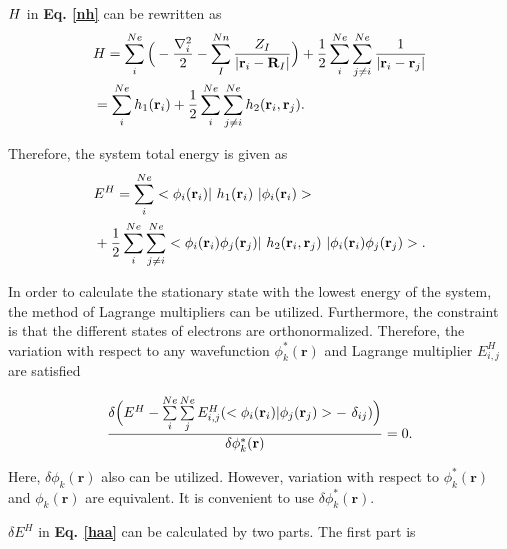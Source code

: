 \documentclass[a4paper, 12pt, titlepage,oneside,drop]{kthesis}
\begin{document}
${{H}}$ in \textbf{Eq. \ref{nh}} can be rewritten as
\begin{equation}\begin{split}
&  {{H}} = \sum\limits_i^{{Ne}} \Big( -\frac{{{\nabla}_{{i}}^{2}}}{2} - \sum\limits_I^{{Nn}} \frac{Z_{I}}{|\textbf{r}_{i}-\textbf{R}_{I}|} \Big) +   \frac{1}{2} \sum\limits_i^{{Ne}} \sum\limits_{j \neq i}^{{Ne}} \frac{1}{ |\textbf{r}_{i}-\textbf{r}_{j}|} \\
& = \sum\limits_i^{{Ne}} h_1(\textbf{r}_{i}) + \frac{1}{2} \sum\limits_i^{{Ne}} \sum\limits_{j \neq i}^{{Ne}} h_2(\textbf{r}_{i},\textbf{r}_{j}).
\end{split}
\end{equation}

Therefore, the system total energy is given as
\begin{equation}\begin{split}\label{bzd}
& E^{H} = \sum\limits_i^{{Ne}} <\bwff<i><i> | \  h_1(\textbf{r}_{i}) \ | \bwff<i><i> > \\
& +\frac{1}{2} \sum\limits_i^{{Ne}} \sum\limits_{j \neq i}^{{Ne}} <\bwff<i><i> \bwff<j><j>|\ h_2(\textbf{r}_{i},\textbf{r}_{j}) \ | \bwff<i><i> \bwff<j><j>>.  
\end{split}\end{equation}

In order to calculate the stationary state with the lowest energy of the system, the method of Lagrange multipliers can be utilized. Furthermore, the constraint is that the different states of electrons are orthonormalized.
Therefore, the variation with respect to any wavefunction $\phi^*_{k}(\textbf{r})$ and Lagrange multiplier $E_{i,j}^{H}$ are satisfied \cite{clasdft,bertsekas2003convex}

\begin{equation}\begin{split}\label{haa}
 \frac{ \delta  \Big(E^{{H}} - \sum\limits_{i}^{Ne} \sum\limits_{j}^{Ne} E_{i,j}^{H} (<\bwff<i><i> | \bwff<j><j>> -\ \delta_{ij})\Big)}{\delta \phi^*_{k}(\textbf{r})}  = 0. 
\end{split}
\end{equation}


Here, $ \delta \phi_{k}(\textbf{r})$ also can be utilized. However, variation with respect to $\phi^*_{k}(\textbf{r})$ and $\phi_{k}(\textbf{r})$ are equivalent. It is convenient to use $\delta \phi^*_{k}(\textbf{r})$.

$\delta E^{{H}}$ in \textbf{Eq. \ref{haa}} can be calculated by two parts. The first part is 
\end{document}
